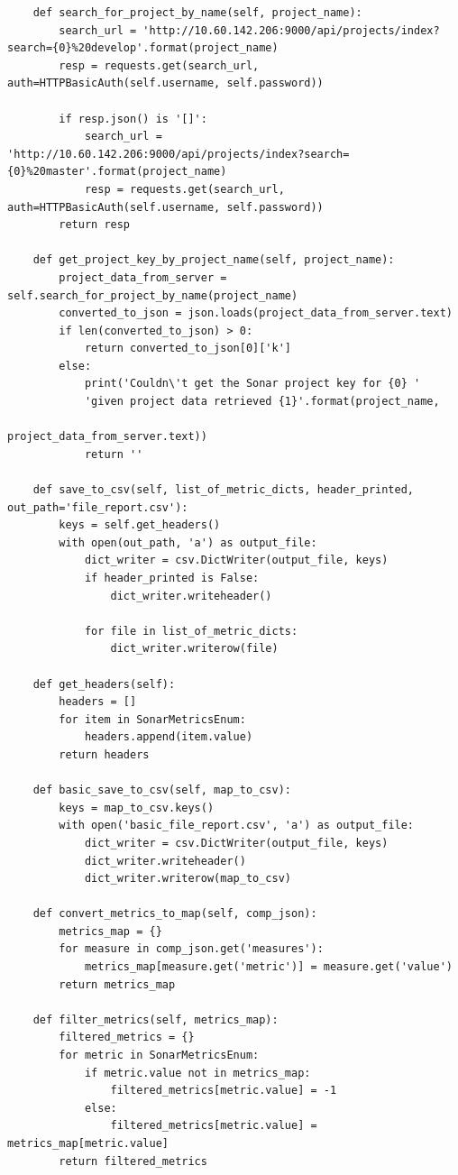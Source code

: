 \begin{landscape}
\begin{code}
\begin{verbatim}
    def search_for_project_by_name(self, project_name):
        search_url = 'http://10.60.142.206:9000/api/projects/index?search={0}%20develop'.format(project_name)
        resp = requests.get(search_url, auth=HTTPBasicAuth(self.username, self.password))

        if resp.json() is '[]':
            search_url = 'http://10.60.142.206:9000/api/projects/index?search={0}%20master'.format(project_name)
            resp = requests.get(search_url, auth=HTTPBasicAuth(self.username, self.password))
        return resp

    def get_project_key_by_project_name(self, project_name):
        project_data_from_server = self.search_for_project_by_name(project_name)
        converted_to_json = json.loads(project_data_from_server.text)
        if len(converted_to_json) > 0:
            return converted_to_json[0]['k']
        else:
            print('Couldn\'t get the Sonar project key for {0} '
            'given project data retrieved {1}'.format(project_name,
                                                                                                        project_data_from_server.text))
            return ''

    def save_to_csv(self, list_of_metric_dicts, header_printed, out_path='file_report.csv'):
        keys = self.get_headers()
        with open(out_path, 'a') as output_file:
            dict_writer = csv.DictWriter(output_file, keys)
            if header_printed is False:
                dict_writer.writeheader()

            for file in list_of_metric_dicts:
                dict_writer.writerow(file)

    def get_headers(self):
        headers = []
        for item in SonarMetricsEnum:
            headers.append(item.value)
        return headers

    def basic_save_to_csv(self, map_to_csv):
        keys = map_to_csv.keys()
        with open('basic_file_report.csv', 'a') as output_file:
            dict_writer = csv.DictWriter(output_file, keys)
            dict_writer.writeheader()
            dict_writer.writerow(map_to_csv)

    def convert_metrics_to_map(self, comp_json):
        metrics_map = {}
        for measure in comp_json.get('measures'):
            metrics_map[measure.get('metric')] = measure.get('value')
        return metrics_map

    def filter_metrics(self, metrics_map):
        filtered_metrics = {}
        for metric in SonarMetricsEnum:
            if metric.value not in metrics_map:
                filtered_metrics[metric.value] = -1
            else:
                filtered_metrics[metric.value] = metrics_map[metric.value]
        return filtered_metrics
 \end{verbatim}
 \end{code}

\end{landscape}
